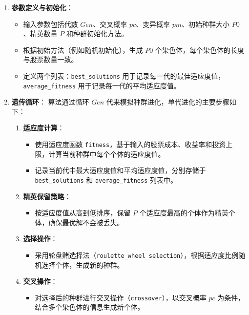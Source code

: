 \documentclass[journal,twoside,web]{ieeecolor}
\begin{document}
\begin{enumerate}

    \item \textbf{参数定义与初始化}：
    \begin{itemize}
        \item 输入参数包括代数 $Gen$、交叉概率 $pc$、变异概率 $pm$、初始种群大小 $P0$、精英数量 $P$ 和种群初始化方法。
        \item 根据初始方法（例如随机初始化），生成 $P0$ 个染色体，每个染色体的长度与股票数量一致。
        \item 定义两个列表：\texttt{best\_solutions} 用于记录每一代的最佳适应度值，\texttt{average\_fitness} 用于记录每一代的平均适应度值。
    \end{itemize}

    \item \textbf{遗传循环}：
    算法通过循环 $Gen$ 代来模拟种群进化，单代进化的主要步骤如下：
    \begin{enumerate}
        \item \textbf{适应度计算}：
        \begin{itemize}
            \item 使用适应度函数 \texttt{fitness}，基于输入的股票成本、收益率和投资上限，计算当前种群中每个个体的适应度值。
            \item 记录当前代中最大适应度值和平均适应度值，分别存储于 \texttt{best\_solutions} 和 \texttt{average\_fitness} 列表中。
        \end{itemize}

        \item \textbf{精英保留策略}：
        \begin{itemize}
            \item 按适应度值从高到低排序，保留 $P$ 个适应度最高的个体作为精英个体，确保最优解不会被丢失。
        \end{itemize}

        \item \textbf{选择操作}：
        \begin{itemize}
            \item 采用轮盘赌选择法（\texttt{roulette\_wheel\_selection}），根据适应度比例随机选择个体，生成新的种群。
        \end{itemize}

        \item \textbf{交叉操作}：
        \begin{itemize}
            \item 对选择后的种群进行交叉操作（\texttt{crossover}），以交叉概率 $pc$ 为条件，结合多个染色体的信息生成新个体。
        \end{itemize}


\end{enumerate}
\end{enumerate}
\end{document}
